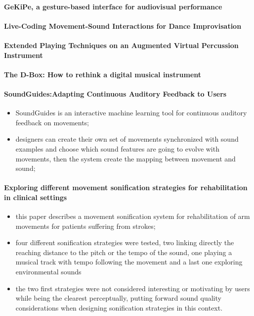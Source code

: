 \documentclass[11pt]{article}
\begin{document}
\paragraph{GeKiPe, a gesture-based interface for audiovisual performance} \citep{fernandez_gekipe_2017} 

\paragraph{Live-Coding Movement-Sound Interactions for Dance Improvisation} \citep{francoise_live-coding_2020} 

\paragraph{Extended Playing Techniques on an Augmented Virtual Percussion Instrument} \citep{zappi_extended_2018} 

\paragraph{The D-Box: How to rethink a digital musical instrument} \citep{zappi_d-box_2015} 

\paragraph{SoundGuides:Adapting Continuous Auditory Feedback to Users} \citep{francoise_soundguides_2016} 
\begin{itemize}
    \item SoundGuides is an interactive machine learning tool for continuous auditory feedback on movements;
    \item designers can create their own set of movements synchronized with sound examples and choose which sound features are going to evolve with movements, then the system create the mapping between movement and sound;
\end{itemize}

\paragraph{Exploring different movement sonification strategies for rehabilitation in clinical settings} \citep{bevilacqua_exploring_2018}
\begin{itemize}
    \item this paper describes a movement sonification system for rehabilitation of arm movements for patients suffering from strokes;
    \item four different sonification strategies were tested, two linking directly the reaching distance to the pitch or the tempo of the sound, one playing a musical track with tempo following the movement and a last one exploring environmental sounds
    \item the two first strategies were not considered interesting or motivating by users while being the clearest perceptually, putting forward sound quality considerations when designing sonification strategies in this context.
\end{itemize}
\end{document}
